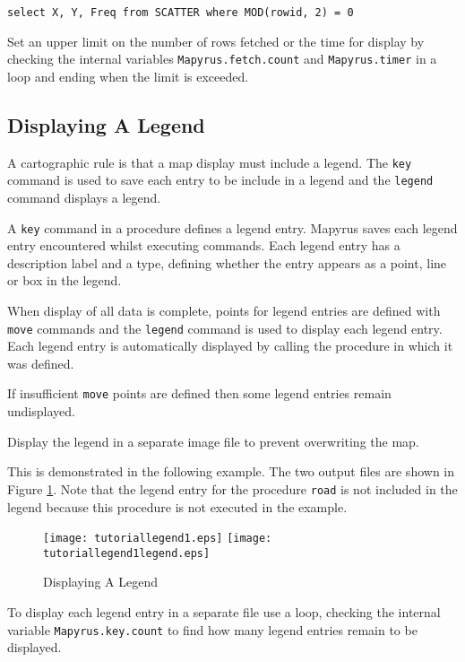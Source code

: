 \begin{verbatim}
select X, Y, Freq from SCATTER where MOD(rowid, 2) = 0
\end{verbatim}

Set an upper limit on the number of rows fetched or the time for display by
checking the internal variables \texttt{Mapyrus.fetch.count} and
\texttt{Mapyrus.timer} in a loop and ending when the limit is exceeded.

\subsection{Displaying A Legend}

A cartographic rule is that a map display must include a legend.  The
\texttt{key} command is used to save each entry to be include in a legend and
the \texttt{legend} command displays a legend.

A \texttt{key} command in a procedure defines a legend entry.  Mapyrus saves
each legend entry encountered whilst executing commands.  Each legend entry has
a description label and a type, defining whether the entry appears as a point,
line or box in the legend.

When display of all data is complete, points for legend entries are defined
with \texttt{move} commands and the \texttt{legend} command is used to display
each legend entry.  Each legend entry is automatically displayed by calling the
procedure in which it was defined.

If insufficient \texttt{move} points are defined then some legend entries
remain undisplayed.

Display the legend in a separate image file to prevent overwriting the map.

This is demonstrated in the following example.
The two output files are shown in Figure \ref{tutoriallegend1}.
Note that the legend entry for the procedure \texttt{road} is
not included in the legend because this procedure is not
executed in the example.



\begin{figure}[htb]
\texttt{[image: tutoriallegend1.eps]}
\texttt{[image: tutoriallegend1legend.eps]}
\caption{Displaying A Legend}
\label{tutoriallegend1}
\end{figure}

To display each legend entry in a separate file use a loop, checking the
internal variable \texttt{Mapyrus.key.count} to find how many legend entries
remain to be displayed.

